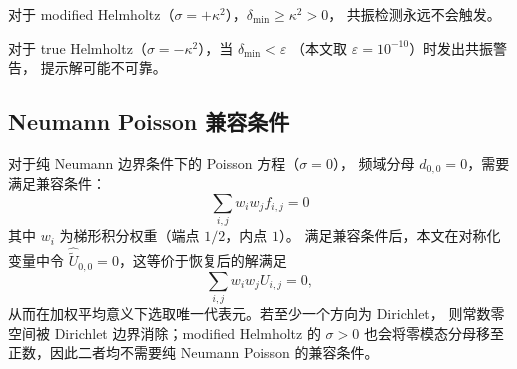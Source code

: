 对于 modified Helmholtz（$\sigma=+\kappa^2$），$\delta_{\min} \geq \kappa^2 > 0$，
共振检测永远不会触发。

对于 true Helmholtz（$\sigma=-\kappa^2$），当 $\delta_{\min} < \varepsilon$
（本文取 $\varepsilon = 10^{-10}$）时发出共振警告，
提示解可能不可靠。

\subsection{Neumann Poisson 兼容条件}

对于纯 Neumann 边界条件下的 Poisson 方程（$\sigma=0$），
频域分母 $d_{0,0} = 0$，需要满足兼容条件：
\begin{equation}
  \sum_{i,j} w_i w_j f_{i,j} = 0
  \label{eq:neumann_compat}
\end{equation}
其中 $w_i$ 为梯形积分权重（端点 $1/2$，内点 $1$）。
满足兼容条件后，本文在对称化变量中令
$\widehat{\tilde U}_{0,0}=0$，这等价于恢复后的解满足
\[
  \sum_{i,j} w_iw_j U_{i,j}=0,
\]
从而在加权平均意义下选取唯一代表元。若至少一个方向为 Dirichlet，
则常数零空间被 Dirichlet 边界消除；modified Helmholtz 的 $\sigma>0$
也会将零模态分母移至正数，因此二者均不需要纯 Neumann Poisson
的兼容条件。
